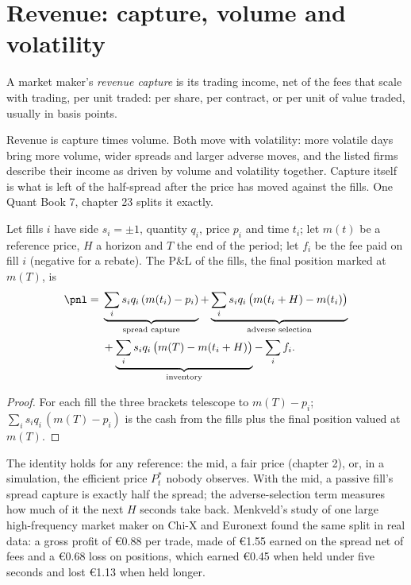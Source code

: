 \section{Revenue: capture, volume and volatility}

\begin{definition}\label{def:hf:the-business-of-market-making:capture}
A market maker's \emph{revenue capture} is its trading income, net of the fees that scale with trading, per unit traded: per
share, per contract, or per unit of value traded, usually in basis points.
\end{definition}

Revenue is capture times volume. Both move with volatility: more volatile days bring more volume, wider spreads and larger adverse moves, and the
listed firms describe their income as driven by volume and volatility together. Capture itself is what is left of the half-spread after the price
has moved against the fills. One Quant Book 7, chapter 23 splits it exactly.

\begin{proposition}\label{prop:hf:the-business-of-market-making:split}
Let fills $i$ have side $s_i=\pm1$, quantity $q_i$, price $p_i$ and time $t_i$; let $m(t)$ be a reference price, $H$ a horizon and $T$ the end of
the period; let $f_i$ be the fee paid on fill $i$ (negative for a rebate). The P\&L of the fills, the final position marked at $m(T)$, is
\begin{align*}
\pnl={}&\underbrace{\sum_i s_iq_i\,(m(t_i)-p_i)}_{\text{spread capture}}
+\underbrace{\sum_i s_iq_i\,\bigl(m(t_i+H)-m(t_i)\bigr)}_{\text{adverse selection}}\\
&+\underbrace{\sum_i s_iq_i\,\bigl(m(T)-m(t_i+H)\bigr)}_{\text{inventory}}-\sum_i f_i .
\end{align*}
\end{proposition}

\begin{proof}
For each fill the three brackets telescope to $m(T)-p_i$; $\sum_i s_iq_i\,(m(T)-p_i)$ is the cash from the fills plus the final position valued at
$m(T)$.
\end{proof}

The identity holds for any reference: the mid, a fair price (chapter 2), or, in a simulation, the efficient price $P^\ast_t$ nobody observes. With
the mid, a passive fill's spread capture is exactly half the spread; the adverse-selection term measures how much of it the next $H$ seconds take
back. Menkveld's study of one large high-frequency market maker on Chi-X and Euronext found the same split in real data: a gross profit of
\euro0.88 per trade, made of \euro1.55 earned on the spread net of fees and a \euro0.68 loss on positions, which earned \euro0.45 when held
under five seconds and lost \euro1.13 when held longer.

